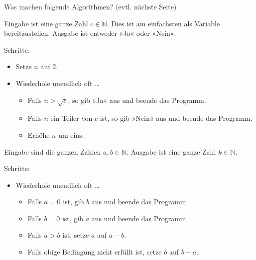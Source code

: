 \documentclass{uebungszettel}
\begin{document}
\begin{aufg}
    Was machen folgende Algorithmen? (evtl. nächste Seite)

    \begin{algorithm}[H]
        \caption{}
        Eingabe ist eine ganze Zahl $c \in \mathbb N$. Dies ist am einfachsten
        als Variable bereitzustellen. Ausgabe ist entweder »Ja« oder »Nein«.

        Schritte:
        \begin{itemize}
            \item
                Setze $n$ auf 2.
            \item
                Wiederhole unendlich oft …
                \begin{itemize}
                    \item
                        Falls $n > \sqrt c$, so gib »Ja« aus und beende das
                        Programm.
                    \item
                        Falls $n$ ein Teiler von $c$ ist, so gib »Nein« aus und
                        beende das Programm.
                    \item
                        Erhöhe $n$ um eins.
                \end{itemize}
        \end{itemize}
    \end{algorithm}

    \begin{algorithm}[H]
        \caption{}
        Eingabe sind die ganzen Zahlen $a, b \in \mathbb N$. Ausgabe ist eine
        ganze Zahl $k \in \mathbb N$.

        Schritte:
        \begin{itemize}
            \item Wiederhole unendlich oft …
                \begin{itemize}
                    \item
                        Falls $a = 0$ ist, gib $b$ aus und beende das Programm.
                    \item
                        Falls $b = 0$ ist, gib $a$ aus und beende das Programm.
                    \item
                        Falls $a > b$ ist, setze $a$ auf $a - b$.
                    \item
                        Falls obige Bedingung nicht erfüllt ist, setze $b$ auf
                        $b - a$.
                \end{itemize}
        \end{itemize}
    \end{algorithm}


\end{aufg}
\end{document}
